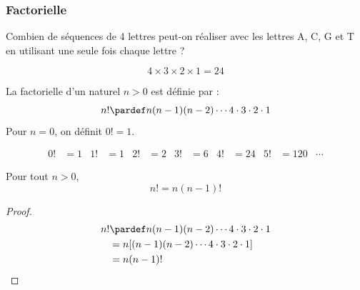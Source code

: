 \begin{frame}
  \frametitle{Factorielle}
  \begin{question}
    Combien de séquences de 4 lettres peut-on réaliser avec les lettres A, C, G et T en utilisant une seule fois chaque lettre ?
  \end{question}
  \begin{answer}
    \begin{equation*}
      4 \times 3 \times 2 \times 1 = 24
    \end{equation*}
  \end{answer}\pause
  \begin{definition}
    La factorielle d'un naturel \(n > 0\) est définie par :
    \begin{equation*}
      n! \pardef n (n-1)(n-2) \cdots 4 \cdot 3 \cdot 2 \cdot 1
    \end{equation*}
    Pour \(n = 0\), on définit \(0! = 1\).
  \end{definition}\pause
  \begin{example}
    \begin{align*}
      0! &= 1 & 1! &= 1 & 2! &= 2 & 3! &= 6 & 4! &= 24 & 5! &= 120 & \cdots
    \end{align*}
  \end{example}
\end{frame}
\begin{frame}
  \begin{proposition}Pour tout \(n > 0\),
    \begin{equation*}
      n! = n (n-1)!
    \end{equation*}
  \end{proposition}
  \begin{proof}\pause
    \begin{align*}
      n! &\pardef n (n-1)(n-2) \cdots 4 \cdot 3 \cdot 2 \cdot 1\\
         &= n [(n-1)(n-2) \cdots 4 \cdot 3 \cdot 2 \cdot 1]\\
         &= n (n-1)!
    \end{align*}
  \end{proof}
\end{frame}
